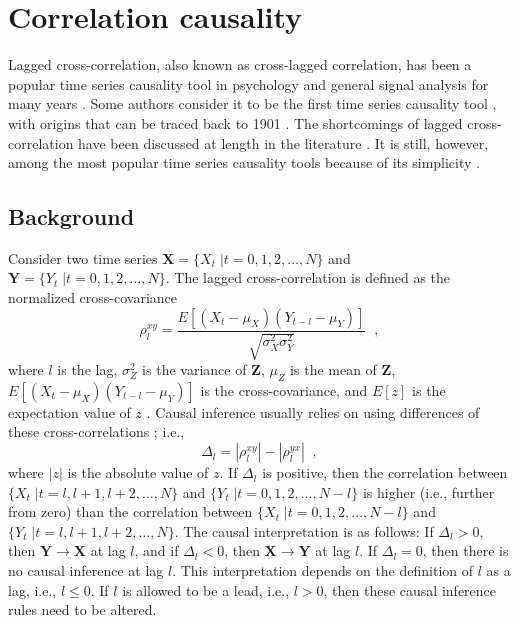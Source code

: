 \section{Correlation causality}
Lagged cross-correlation, also known as cross-lagged correlation, has been a popular time series causality tool in psychology \cite{Kenny1975,Rogosa1980} and general signal analysis for many years \cite{Mcnames2007}.  Some authors consider it to be the first time series causality tool \cite{Kenny1975}, with origins that can be traced back to 1901 \cite{Bartlett1935}.  The shortcomings of lagged cross-correlation have been discussed at length in the literature \cite{Rogosa1980,Runge2014,Mcnames2007}.  It is still, however, among the most popular time series causality tools because of its simplicity \cite{Mcnames2007,Rogosa1980}.  

\subsection{Background}
Consider two time series $\mathbf{X} = \{X_t\;|t=0,1,2,\ldots,N\}$ and $\mathbf{Y} = \{Y_t\;|t=0,1,2,\ldots,N\}$.  The lagged cross-correlation is defined as the normalized cross-covariance \cite{Box2013}
\begin{equation}
\rho^{xy}_l = \frac{E\left[\left(X_t-\mu_X\right)\left(Y_{t-l}-\mu_Y\right)\right]}{\sqrt{\sigma^2_X\sigma^2_Y}}\;\;,
\end{equation}
where $l$ is the lag, $\sigma^2_Z$ is the variance of $\mathbf{Z}$, $\mu_Z$ is the mean of $\mathbf{Z}$, $E\left[\left(X_t-\mu_X\right)\left(Y_{t-l}-\mu_Y\right)\right]$ is the cross-covariance, and $E[z]$ is the expectation value of $z$ \cite{Carter1987,Mcnames2007,Box2013}.  Causal inference usually relies on using differences of these cross-correlations \cite{Rogosa1980,Rozelle1969,Yee1968}; i.e.,
\begin{equation}
\Delta_l = |\rho^{xy}_l| - |\rho^{yx}_l|\;\;,
\end{equation}
where $|z|$ is the absolute value of $z$.  If $\Delta_l$ is positive, then the correlation between $\{X_t\;|t=l,l+1,l+2,\ldots,N\}$ and $\{Y_t\;|t=0,1,2,\ldots,N-l\}$ is higher (i.e., further from zero) than the correlation between $\{X_t\;|t=0,1,2,\ldots,N-l\}$ and $\{Y_t\;|t=l,l+1,l+2,\ldots,N\}$.  The causal interpretation is as follows: If $\Delta_l > 0$, then $\mathbf{Y}\rightarrow\mathbf{X}$ at lag $l$, and if $\Delta_l < 0$, then $\mathbf{X}\rightarrow\mathbf{Y}$ at lag $l$.  If $\Delta_l = 0$, then there is no causal inference at lag $l$.  This interpretation depends on the definition of $l$ as a lag, i.e., $l\le 0$.  If $l$ is allowed to be a lead, i.e., $l>0$, then these causal inference rules need to be altered.

